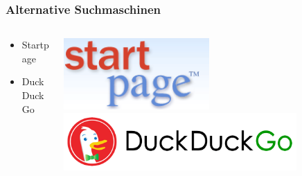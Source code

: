   \begin{frame}
    \frametitle{Alternative Suchmaschinen}
    \begin{columns}
        \begin{column}{5cm}
            \begin{center}
                    \begin{itemize}
                            \item Startpage
                            \vspace{2cm}
                            \item DuckDuckGo
                    \end{itemize}
            \end{center}
        \end{column}
        \begin{column}{5cm}
            \begin{center}
                \includegraphics[width=0.5\textwidth]{img/startp_logo.png}
                \vspace{1cm}
                \includegraphics[width=0.8\textwidth]{img/duckduckgo.png}
            \end{center}
        \end{column}
    \end{columns}
  \end{frame}
